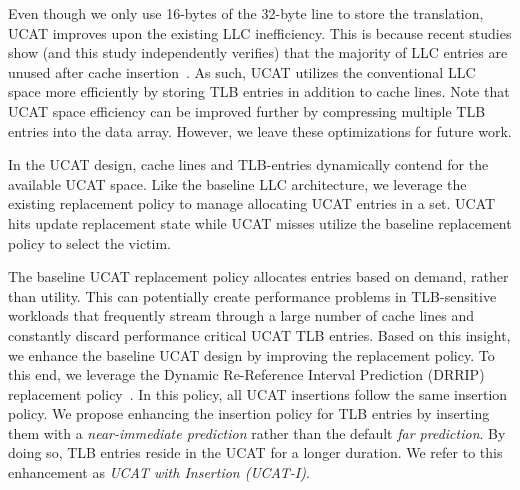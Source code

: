 Even though we only use 16-bytes of the 32-byte line to store the
translation, UCAT improves upon the existing LLC inefficiency. This is
because recent studies show (and this study independently verifies)
that the majority of LLC entries are unused after cache
insertion~\cite{jaleel_rrip,setdueling,wu2011,jimenez_micro2013,khan2010}.
As such, UCAT utilizes the conventional LLC space more efficiently by
storing TLB entries in addition to cache lines. Note that UCAT space
efficiency can be improved further by compressing multiple TLB entries
into the data array. However, we leave these optimizations for future
work.

In the UCAT design, cache lines and TLB-entries dynamically contend for
the available UCAT space. Like the baseline LLC architecture, we
leverage the existing replacement policy to manage allocating UCAT
entries in a set. UCAT hits update replacement state while UCAT misses
utilize the baseline replacement policy to select the victim.

The baseline UCAT replacement policy allocates entries based on
demand, rather than utility. This can potentially create performance
problems in TLB-sensitive workloads that frequently stream through a
large number of cache lines and constantly discard performance
critical UCAT TLB entries. Based on this insight, we enhance the
baseline UCAT design by improving the replacement policy. To this end,
we leverage the Dynamic Re-Reference Interval Prediction (DRRIP)
replacement policy~\cite{jaleel_rrip}. In this policy, all UCAT
insertions follow the same insertion policy. We propose enhancing the
insertion policy for TLB entries by inserting them with a {\em
near-immediate prediction} rather than the default {\em far
prediction}. By doing so, TLB entries reside in the UCAT for a longer
duration. We refer to this enhancement as {\em UCAT with Insertion
(UCAT-I)}.

% 
% 

